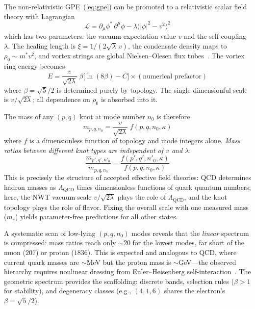 \documentclass[11pt,a4paper]{article}
\begin{document}
The non-relativistic GPE~(\ref{eq:gpe}) can be promoted to a
relativistic scalar field theory with Lagrangian
\begin{equation}
  \mathcal{L} = \partial_\mu\phi^*\,\partial^\mu\phi
  - \lambda\bigl(|\phi|^2 - v^2\bigr)^2
  \label{eq:abelian}
\end{equation}
which has two parameters: the vacuum expectation value $v$ and the
self-coupling $\lambda$.  The healing length is
$\xi = 1/(2\sqrt{\lambda}\,v)$, the condensate density maps to
$\rho_0 \sim m^* v^2$, and vortex strings are global
Nielsen--Olesen flux tubes~\cite{Vilenkin}.  The vortex ring energy
becomes
\begin{equation}
  E = \frac{v}{\sqrt{2\lambda}}\;\beta\bigl[\ln(8\beta) - C\bigr]
    \times (\text{numerical prefactor})
  \label{eq:E_rel}
\end{equation}
where $\beta = \sqrt{5}/2$ is determined purely by topology.  The
single dimensionful scale is $v/\sqrt{2\lambda}$; all dependence on
$\rho_0$ is absorbed into it.

The mass of any $(p,q)$ knot at mode number $n_0$ is therefore
\begin{equation}
  m_{p,q,n_0} = \frac{v}{\sqrt{2\lambda}}\;
    f(p,q,n_0,\kappa)
  \label{eq:mass_spectrum}
\end{equation}
where $f$ is a dimensionless function of topology and mode integers
alone.  \emph{Mass ratios between different knot types are
independent of $v$ and $\lambda$}:
\begin{equation}
  \frac{m_{p',q',n'_0}}{m_{p,q,n_0}}
    = \frac{f(p',q',n'_0,\kappa)}{f(p,q,n_0,\kappa)}
  \label{eq:mass_ratios}
\end{equation}
This is precisely the structure of accepted effective field theories:
QCD determines hadron masses as $\Lambda_{\text{QCD}}$ times
dimensionless functions of quark quantum numbers; here, the NWT
vacuum scale $v/\sqrt{2\lambda}$ plays the role of
$\Lambda_{\text{QCD}}$, and the knot topology plays the role of
flavor.  Fixing the overall scale with one measured mass ($m_e$)
yields parameter-free predictions for all other states.

A systematic scan of low-lying $(p,q,n_0)$ modes reveals that the
\emph{linear} spectrum is compressed: mass ratios reach only
$\sim\!20$ for the lowest modes, far short of the muon ($207$)
or proton ($1836$).  This is expected and analogous to QCD, where
current quark masses are $\sim$MeV but the proton mass is
$\sim$GeV---the observed hierarchy requires nonlinear dressing
from Euler--Heisenberg self-interaction~\cite{paper4}.  The
geometric spectrum provides the scaffolding: discrete bands,
selection rules ($\beta > 1$ for stability), and degeneracy
classes (e.g., $(4,1,6)$ shares the electron's $\beta = \sqrt{5}/2$).
\end{document}
